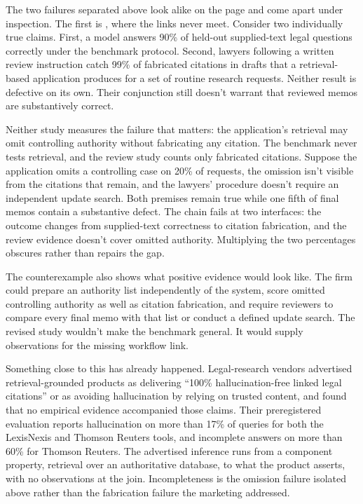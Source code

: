\documentclass[12pt]{article}
\begin{document}
The two failures separated above look alike on the page and come apart under inspection. The first is , where the links never meet. Consider two individually true claims. First, a model answers 90\% of held-out supplied-text legal questions correctly under the benchmark protocol. Second, lawyers following a written review instruction catch 99\% of fabricated citations in drafts that a retrieval-based application produces for a set of routine research requests. Neither result is defective on its own. Their conjunction still doesn't warrant that reviewed memos are substantively correct.

Neither study measures the failure that matters: the application's retrieval may omit controlling authority without fabricating any citation. The benchmark never tests retrieval, and the review study counts only fabricated citations. Suppose the application omits a controlling case on 20\% of requests, the omission isn't visible from the citations that remain, and the lawyers' procedure doesn't require an independent update search. Both premises remain true while one fifth of final memos contain a substantive defect. The chain fails at two interfaces: the outcome changes from supplied-text correctness to citation fabrication, and the review evidence doesn't cover omitted authority. Multiplying the two percentages obscures rather than repairs the gap.

The counterexample also shows what positive evidence would look like. The firm could prepare an authority list independently of the system, score omitted controlling authority as well as citation fabrication, and require reviewers to compare every final memo with that list or conduct a defined update search. The revised study wouldn't make the benchmark general. It would supply observations for the missing workflow link.

Something close to this has already happened. Legal-research vendors advertised retrieval-grounded products as delivering \enquote{100\% hallucination-free linked legal citations} or as avoiding hallucination by relying on trusted content, and \textcite[234]{magesh2025legalhallucination} found that no empirical evidence accompanied those claims. Their preregistered evaluation reports hallucination on more than 17\% of queries for both the LexisNexis and Thomson Reuters tools, and incomplete answers on more than 60\% for Thomson Reuters. The advertised inference runs from a component property, retrieval over an authoritative database, to what the product asserts, with no observations at the join. Incompleteness is the omission failure isolated above rather than the fabrication failure the marketing addressed.
\end{document}
